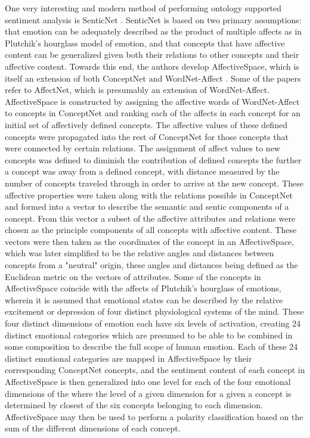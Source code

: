 \documentclass[letterpaper, 10 pt, conference]{ieeeconf}
\begin{document}
One very interesting and modern method of performing ontology supported sentiment analysis is SenticNet \textcolor{gray}{\cite{CambriaSpeer,CambriaHavasi,CambriaOlsher,CambriaPoria}}. SenticNet is based on two primary assumptions: that emotion can be adequately described as the product of multiple affects as in Plutchik's hourglass model of emotion, and that concepts that have affective content can be generalized given both their relations to other concepts and their affective content. Towards this end, the authors develop AffectiveSpace, which is itself an extension of both ConceptNet and WordNet-Affect \textcolor{gray}{\cite{CambriaFu}}. Some of the papers refer to AffectNet, which is presumably an extension of WordNet-Affect. AffectiveSpace is constructed by assigning the affective words of WordNet-Affect to concepts in ConceptNet and ranking each of the affects in each concept for an initial set of affectively defined concepts. The affective values of these defined concepts were propagated into the rest of ConceptNet for those concepts that were connected by certain relations. The assignment of affect values to new concepts was defined to diminish the contribution of defined concepts the further a concept was away from a defined concept, with distance measured by the number of concepts traveled through in order to arrive at the new concept. These affective properties were taken along with the relations possible in ConceptNet and formed into a vector to describe the semantic and sentic components of a concept. From this vector a subset of the affective attributes and relations were chosen as the principle components of all concepts with affective content. These vectors were then taken as the coordinates of the concept in an AffectiveSpace, which was later simplified to be the relative angles and distances between concepts from a "neutral" origin, these angles and distances being defined as the Euclidean metric on the vectors of attributes. Some of the concepts in AffectiveSpace coincide with the affects of Plutchik's hourglass of emotions, wherein it is assumed that emotional states can be described by the relative excitement or depression of four distinct physiological systems of the mind. These four distinct dimensions of emotion each have six levels of activation, creating 24 distinct emotional categories which are presumed to be able to be combined in some composition to describe the full scope of human emotion. Each of these 24 distinct emotional categories are mapped in AffectiveSpace by their corresponding ConceptNet concepts, and the sentiment content of each concept in AffectiveSpace is then generalized into one level for each of the four emotional dimensions of the where the level of a given dimension for a given a concept is determined by closest of the six concepts belonging to each dimension. AffectiveSpace may then be used to perform a polarity classification based on the sum of the different dimensions of each concept.
\end{document}
